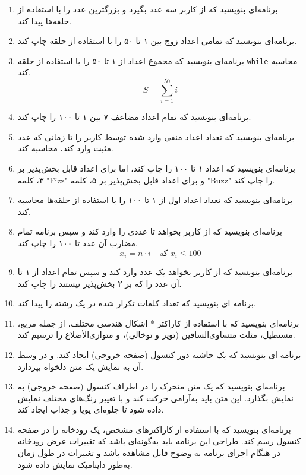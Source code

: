 \documentclass[b5paper,12pt]{article}
\begin{document}
\begin{enumerate}
		\item برنامه‌ای بنویسید که از کاربر سه عدد بگیرد و بزرگترین عدد را با استفاده از حلقه‌ها پیدا کند.
		
		\item برنامه‌ای بنویسید که تمامی اعداد زوج بین ۱ تا ۵۰ را با استفاده از حلقه چاپ کند.
		
		\item برنامه‌ای بنویسید که مجموع اعداد از ۱ تا ۵۰ را با استفاده از حلقه \texttt{while} محاسبه کند.
		\[
		S = \sum_{i=1}^{50} i
		\]
		
		\item برنامه‌ای بنویسید که تمام اعداد مضاعف ۷ بین ۱ تا ۱۰۰ را چاپ کند.
		
		\item برنامه‌ای بنویسید که تعداد اعداد منفی وارد شده توسط کاربر را تا زمانی که عدد مثبت وارد کند، محاسبه کند.
		
		\item برنامه‌ای بنویسید که اعداد ۱ تا ۱۰۰ را چاپ کند، اما برای اعداد قابل بخش‌پذیر بر ۳، کلمه "Fizz" و برای اعداد قابل بخش‌پذیر بر ۵، کلمه "Buzz" را چاپ کند.
		
		\item برنامه‌ای بنویسید که تعداد اعداد اول از ۱ تا ۱۰۰ را با استفاده از حلقه‌ها محاسبه کند.
		
		\item برنامه‌ای بنویسید که از کاربر بخواهد تا عددی را وارد کند و سپس برنامه تمام مضارب آن عدد تا ۱۰۰ را چاپ کند.
		\[
		x_i = n \cdot i \quad \text{که } x_i \leq 100
		\]
		
		\item برنامه‌ای بنویسید که از کاربر بخواهد یک عدد وارد کند و سپس تمام اعداد از ۱ تا آن عدد را که بر ۲ بخش‌پذیر نیستند را چاپ کند.

		\item برنامه ای بنویسید که تعداد کلمات تکرار شده در یک رشته را پیدا کند.
		
		\item برنامه‌ای بنویسید که با استفاده از کاراکتر * اشکال هندسی مختلف، از جمله مربع، مستطیل، مثلث متساوی‌الساقین (توپر و توخالی)، و متوازی‌الأضلاع را ترسیم کند.

		\item برنامه ای بنویسید که یک حاشیه دور کنسول (صفحه خروجی) ایجاد کند. و در وسط آن به نمایش یک متن دلخواه بپردازد.
	
		\item برنامه‌ای بنویسید که یک متن متحرک را در اطراف کنسول (صفحه خروجی) به نمایش بگذارد. این متن باید به‌آرامی حرکت کند و با تغییر رنگ‌های مختلف نمایش داده شود تا جلوه‌ای پویا و جذاب ایجاد کند.

		\item برنامه‌ای بنویسید که با استفاده از کاراکترهای مشخص، یک رودخانه را در صفحه کنسول رسم کند. طراحی این برنامه باید به‌گونه‌ای باشد که تغییرات عرض رودخانه در هنگام اجرای برنامه به وضوح قابل مشاهده باشد و تغییرات در طول زمان به‌طور داینامیک نمایش داده شود.
		
	\end{enumerate}
\end{document}
